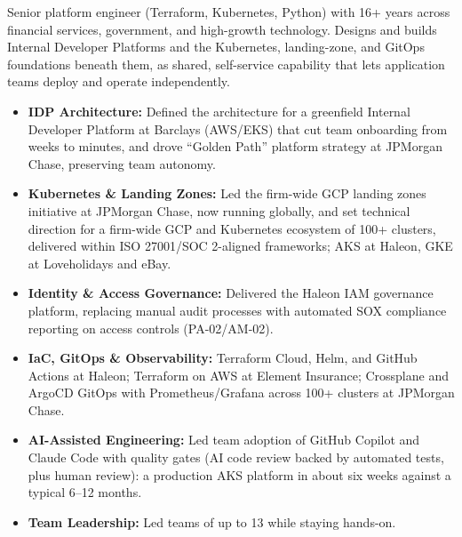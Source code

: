 
\begin{cvparagraph}
      Senior platform engineer (Terraform, Kubernetes, Python) with 16+ years across financial services, government, and
      high-growth technology. Designs and builds Internal Developer Platforms and the Kubernetes, landing-zone, and GitOps
      foundations beneath them, as shared, self-service capability that lets application teams deploy and operate independently.

      \begin{itemize}[nosep]
            \item \textbf{IDP Architecture:} Defined the architecture for a greenfield Internal Developer Platform at Barclays
                  (AWS/EKS) that cut team onboarding from weeks to minutes, and drove ``Golden Path'' platform strategy
                  at JPMorgan Chase, preserving team autonomy.
            \item \textbf{Kubernetes \& Landing Zones:} Led the firm-wide GCP landing zones initiative at JPMorgan Chase, now running
                  globally, and set technical direction for a firm-wide GCP and Kubernetes ecosystem of 100+ clusters, delivered within
                  ISO 27001/SOC 2-aligned frameworks; AKS at Haleon, GKE at Loveholidays and eBay.
            \item \textbf{Identity \& Access Governance:} Delivered the Haleon IAM governance platform, replacing manual audit processes
                  with automated SOX compliance reporting on access controls (PA-02/AM-02).
            \item \textbf{IaC, GitOps \& Observability:} Terraform Cloud, Helm, and GitHub Actions at Haleon; Terraform on AWS at Element
                  Insurance; Crossplane and ArgoCD GitOps with Prometheus/Grafana across 100+ clusters at JPMorgan Chase.
            \item \textbf{AI-Assisted Engineering:} Led team adoption of GitHub Copilot and Claude Code with quality gates (AI code
                  review backed by automated tests, plus human review): a production AKS platform in about six weeks against
                  a typical 6--12 months.
            \item \textbf{Team Leadership:} Led teams of up to 13 while staying hands-on.
      \end{itemize}
\end{cvparagraph}
